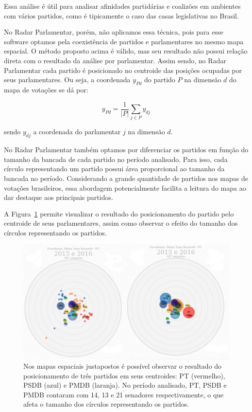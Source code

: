 \documentclass[
	article,			%
	12pt,				%
	oneside,			%
	a4paper,			%
	english,			%
	brazil,				%
	sumario=tradicional,
	oldfontcommands %
	]{abntex2}
\begin{document}
Essa análise é útil para analisar afinidades partidárias e coalizões em ambientes com vários partidos, como é tipicamente o caso das casas legislativas no Brasil.

No Radar Parlamentar, porém, não aplicamos essa técnica, pois para esse software optamos pela coexistência de partidos e parlamentares no mesmo mapa espacial. O método proposto acima é válido, mas seu resultado não possui relação direta com o resultado da análise por parlamentar. Assim sendo, no Radar Parlamentar cada partido é posicionado no centroide das posições ocupadas por seus parlamentares. Ou seja, a coordenada $y_{Pd}$ do partido $P$ na dimensão $d$ do mapa de votações se dá por:

\begin{equation}
  y_{Pd} = \frac{1}{|P|}\sum_{j\in P}{y_{dj}}
  \label{eq:partido-centroide}
\end{equation}

sendo $y_{dj}$ a coordenada do parlamentar $j$ na dimensão $d$.

No Radar Parlamentar também optamos por diferenciar os partidos em função do tamanho da bancada de cada partido no período analisado. Para isso, cada círculo representando um partido possui área proporcional ao tamanho da bancada no período. Considerando a grande quantidade de partidos nos mapas de votações brasileiros, essa abordagem potencialmente facilita a leitura do mapa ao dar destaque aos principais partidos.

A Figura~\ref{fig:centroide} permite visualizar o resultado do posicionamento do partido pelo centroide de seus parlamentares, assim como observar o efeito do tamanho dos círculos representando os partidos.

\begin{figure}[h]
  \centering
  \includegraphics[scale=0.37]{figs/centroide.png}
  \caption{Nos mapas espaciais justapostos é possível observar o resultado do posicionamento de três partidos em seus centroides: PT (vermelho), PSDB (azul) e PMDB (laranja). No período analisado, PT, PSDB e PMDB contaram com 14, 13 e 21 senadores respectivamente, o que afeta o tamanho dos círculos representando os partidos.}
  \label{fig:centroide}
\end{figure}
\end{document}
